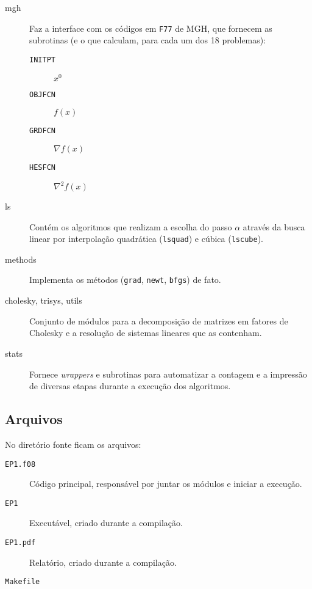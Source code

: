 \documentclass[a4paper,11pt]{article}
\begin{document}
            \begin{description}
                \item[mgh] Faz a interface com os códigos em \texttt{F77} de MGH, que fornecem as subrotinas (e o que calculam, para cada um dos 18 problemas):
                    \begin{description}
                        \item[\texttt{INITPT}] $x^0$
                        \item[\texttt{OBJFCN}] $f(x)$
                        \item[\texttt{GRDFCN}] $\nabla f(x)$
                        \item[\texttt{HESFCN}] $\nabla^2 f(x)$
                    \end{description}

                \item[ls] Contém os algoritmos que realizam a escolha do passo $\alpha$ através da busca linear por interpolação quadrática (\texttt{lsquad}) e cúbica (\texttt{lscube}).
                \item[methods] Implementa os métodos (\texttt{grad}, \texttt{newt}, \texttt{bfgs}) de fato.
                \item[cholesky, trisys, utils] Conjunto de módulos para a decomposição de matrizes em fatores de Cholesky e a resolução de sistemas lineares que as contenham.
                \item[stats] Fornece \emph{wrappers} e subrotinas para automatizar a contagem e a impressão de diversas etapas durante a execução dos algoritmos.
            \end{description}

        \subsection*{Arquivos}
            No diretório fonte ficam os arquivos:
            \begin{description}
                \item[\texttt{EP1.f08}] Código principal, responsável por juntar os módulos e iniciar a execução.
                \item[\texttt{EP1}] Executável, criado durante a compilação.
                \item[\texttt{EP1.pdf}] Relatório, criado durante a compilação.
                \item[\texttt{Makefile}]
            \end{description}
\end{document}
